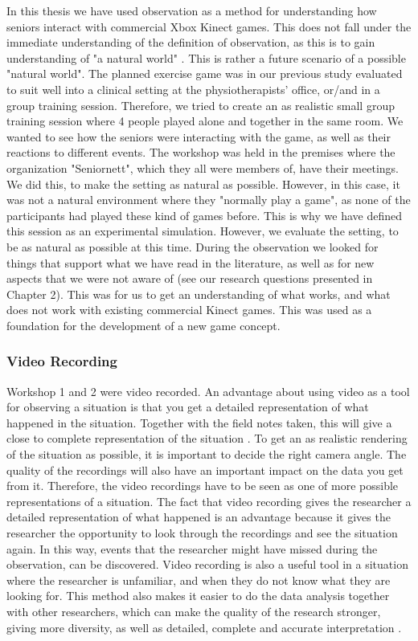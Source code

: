 In this thesis we have used observation as a method for understanding how seniors interact with commercial Xbox Kinect games. This does not fall under the immediate understanding of the definition of observation, as this is to gain understanding of "a natural world" \cite{tjora}. This is rather a future scenario of a possible "natural world". The planned exercise game was in our previous study \cite{project} evaluated to suit well into a clinical setting at the physiotherapists' office, or/and in a group training session. Therefore, we tried to create an as realistic small group training session where 4 people played alone and together in the same room.  We wanted to see how the seniors were interacting with the game, as well as their reactions to different events. The workshop was held in the premises where the organization "Seniornett", which they all were members of, have their meetings. We did this, to make the setting as natural as possible.  However, in this case, it was not a natural environment where they "normally play a game", as none of the participants had played these kind of games before. This is why we have defined this session as an experimental simulation. However, we evaluate the setting, to be as natural as possible at this time.  During the observation we looked for things that support what we have read in the literature, as well as for new aspects that we were not aware of (see our research questions presented in Chapter 2). This was for us to get an understanding of what works, and what does not work with existing commercial Kinect games. This was used as a foundation for the development of a new game concept. 

\subsubsection{Video Recording}
Workshop 1 and 2 were video recorded. An advantage about using video as a tool for observing a situation is that you get a detailed representation of what happened in the situation. Together with the field notes taken, this will give a close to complete representation of the situation \cite{tjora}. To get an as realistic rendering of the situation as possible, it is important to decide the right camera angle. The quality of the recordings will also have an important impact on the data you get from it. Therefore, the video recordings have to be seen as one of more possible representations of a situation.  The fact that video recording gives the researcher a detailed representation of what happened is an advantage because it gives the researcher the opportunity to look through the recordings and see the situation again. In this way, events that the researcher might have missed during the observation, can be discovered. Video recording is also a useful tool in a situation where the researcher is unfamiliar, and when they do not know what they are looking for. This method also makes it easier to do the data analysis together with other researchers, which can make the quality of the research stronger, giving more diversity, as well as detailed, complete and accurate interpretation \cite{tjora}.

